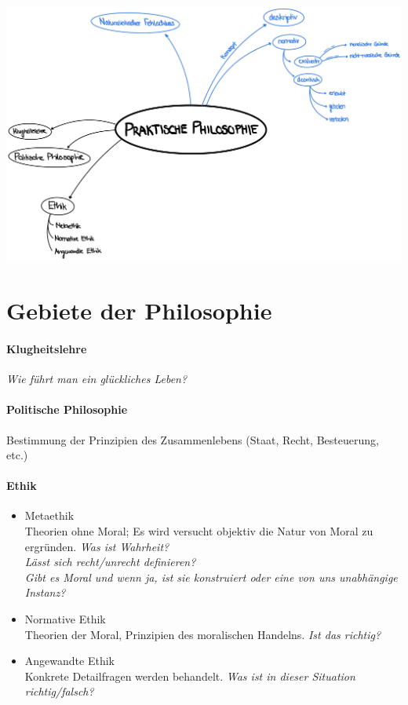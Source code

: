 \documentclass[../main.tex]{subfiles}
\begin{document}
\includegraphics[width=\textwidth]{images/Uebersicht_Einf_Praktische_Philosophie.jpg}

\section{Gebiete der Philosophie}
\paragraph{Klugheitslehre}
\textit{Wie führt man ein glückliches Leben?}

\paragraph{Politische Philosophie}
Bestimmung der Prinzipien des Zusammenlebens (Staat, Recht, Besteuerung, etc.)

\paragraph{Ethik}
\begin{itemize}
  \item Metaethik \\
Theorien ohne Moral; Es wird versucht objektiv die Natur von Moral zu ergründen. \textit{Was ist Wahrheit? \\Lässt sich recht/unrecht definieren? \\Gibt es Moral und wenn ja, ist sie konstruiert oder eine von uns unabhängige Instanz?}
  \item Normative Ethik \\
Theorien der Moral, Prinzipien des moralischen Handelns. \textit{Ist das richtig?}
  \item Angewandte Ethik \\ Konkrete Detailfragen werden behandelt. \textit{Was ist in dieser Situation richtig/falsch?}
\end{itemize}
\end{document}
